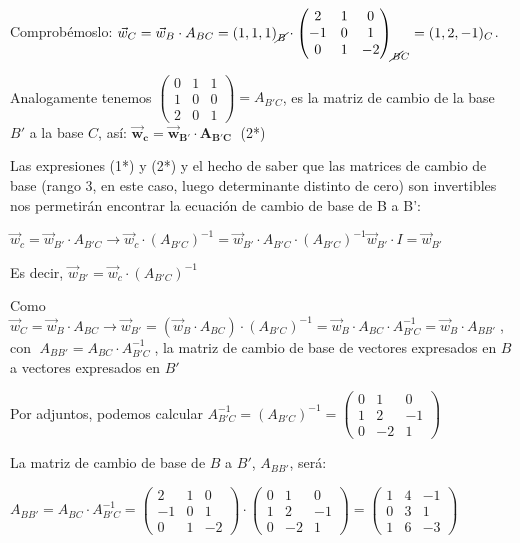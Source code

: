 \noindent \small{Comprobémoslo: $\vec w_C=\vec w_B \cdot A_{BC}=(1,1,1)_{\cancel{B}}\cdot \left( \begin{matrix} 2&1&0\\-1&0&1\\0&1&-2\end{matrix} \right)_{\cancel{B}C}=(1,2,-1)_C$}\normalsize{.}

\noindent Analogamente tenemos $\left( \begin{matrix} 0&1&1\\1&0&0\\2&0&1 \end{matrix} \right)=A_{B'C} $, es la matriz de cambio de la base $B'$ a la base $C$, así: $\boldsymbol{  \vec w_c=\vec w_{B'}\cdot A_{B'C} }\; $ (2*)

\noindent Las expresiones (1*) y (2*) y el hecho de saber que las matrices de cambio de base (rango 3, en este caso, luego determinante distinto de cero) son invertibles nos permetirán encontrar la ecuación de cambio de base de B a B':

\noindent $\vec w_c=\vec w_{B'}\cdot A_{B'C} \to  \vec w_c \cdot (A_{B'C})^{-1}=\vec w_{B'}\cdot A_{B'C} \cdot (A_{B'C})^{-1} \vec w_{B'} \cdot I=   \vec w_{B'} $

\noindent Es decir, $\vec w_{B'} = \vec w_c \cdot (A_{B'C})^{-1}$

\noindent Como $\vec w_C=\vec w_B \cdot A_{BC} \to \vec w_{B'}=(\vec w_B \cdot A_{BC} )\cdot {(A_{B'C})}^{-1}= \vec w_{B}\cdot A_{BC}\cdot A^{-1}_{B'C}=\vec w_B \cdot A_{BB'}\;$, con $\;A_{BB'}= A_{BC}\cdot A^{-1}_{B'C}\;$, la matriz de cambio de base de vectores expresados en $B$ a vectores expresados en $B'$

\noindent Por adjuntos, podemos calcular $A^{-1}_{B'C}={(A_{B'C})}^{-1}= \left( \begin{matrix} 0&1&0\\1&2&-1\\0&-2&1 \end{matrix} \right)$

\noindent La matriz de cambio de base de $B$ a $B'$, $A_{BB'}$, será:

\noindent $A_{BB'}= A_{BC}\cdot A^{-1}_{B'C}=\left( \begin{matrix} 2&1&0\\-1&0&1\\0&1&-2\end{matrix} \right) \cdot \left( \begin{matrix} 0&1&0\\1&2&-1\\0&-2&1 \end{matrix} \right) = \left( \begin{matrix} 1&4&-1\\0&3&1\\1&6&-3 \end{matrix} \right)$


